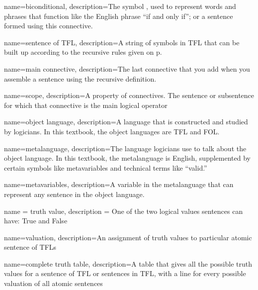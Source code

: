{
name=biconditional,
description={The symbol \eiff, used to represent words and phrases that function like the English phrase ``if and only if''; or a sentence formed using this connective.}
}



{
name=sentence of TFL,
description={A string of symbols in TFL that can be built up according to the recursive rules given on p.~\pageref{TFLsentences}}
}


{
name=main connective,
description={The last connective that you add when you assemble a sentence using the recursive definition.}
}


{
name=scope,
description={A property of connectives. The sentence or subsentence for which that connective is the main logical operator}
}





{
name=object language,
description={A language that is constructed and studied by logicians. In this textbook,
 the object languages are TFL and FOL.}
}

{
name=metalanguage,
description={The language logicians use to talk about the object language. In this textbook, the metalanguage is English, supplemented by certain symbols like metavariables and technical terms like ``valid.''}
}

{
name=metavariables,
description={A variable in the metalanguage that can represent any sentence in the object language.}
}



{
name = truth value,
description = {One of the two logical values sentences can have: True and False}
}



{
name=valuation,
description={An assignment of \glspl{truth value} to particular atomic \glspl{sentence of TFL}}
}

{
name=complete truth table,
description={A table that gives all the possible \glspl{truth value} for a \gls{sentence of TFL} or sentences in TFL, with a line for every possible \gls{valuation} of all atomic sentences}
}


